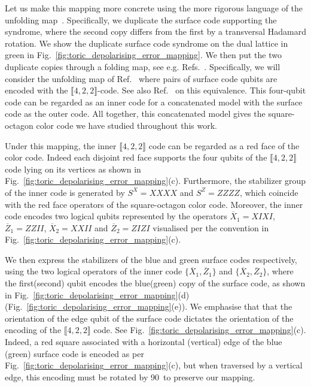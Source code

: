 \documentclass[a4paper,twocolumn,11pt,accepted=2024-12-23]{quantumarticle}
\begin{document}
Let us make this mapping more concrete using the more rigorous language of the unfolding map~\cite{bombin2012universal,Bhagoji15, Kubica_2015}. Specifically, we duplicate the surface code supporting the syndrome, where the second copy differs from the first by a transversal Hadamard rotation. We show the duplicate surface code syndrome on the dual lattice in green in Fig.~\ref{fig:toric_depolarising_error_mapping}.
We then put the two duplicate copies through a folding map, see e.g. Refs.~\cite{bombin2012universal, Kubica_2015, criger2016noise}. Specifically, we will consider the unfolding map of Ref.~\cite{criger2016noise} where pairs of surface code qubits are encoded with the $\llbracket4,2,2 \rrbracket$-code. See also Ref.~\cite{Brell_2011} on this equivalence. This four-qubit code can be regarded as an inner code for a concatenated model with the surface code as the outer code. All together, this concatenated model gives the square-octagon color code we have studied throughout this work.


Under this mapping, the inner $\llbracket4,2,2 \rrbracket$ code can be regarded as a red face of the color code. Indeed each disjoint red face supports the four qubits of the $\llbracket4,2,2 \rrbracket$ code lying on its vertices as shown in Fig.~\ref{fig:toric_depolarising_error_mapping}(c). Furthermore, the stabilizer group of the inner code is generated by $S^X = XXXX$ and $S^Z = ZZZZ$, which coincide with the red face operators of the square-octagon color code. Moreover, the inner code encodes two logical qubits represented by the operators $\overline{X}_1 = XIXI$, $\overline{Z}_1 = ZZII$, $\overline{X}_2 = XXII$ and $\overline{Z}_2 = ZIZI$ visualised per the convention in Fig.~\ref{fig:toric_depolarising_error_mapping}(c). 



We then express the stabilizers of the blue and green surface codes respectively, using the two logical operators of the inner code $\{\overline{X}_1, \overline{Z}_1\}$ and $\{\overline{X}_2, \overline{Z}_2\}$, where the first(second) qubit encodes the blue(green) copy of the surface code, as shown in Fig.~\ref{fig:toric_depolarising_error_mapping}(d) (Fig.~\ref{fig:toric_depolarising_error_mapping}(e)). We emphasise that that the orientation of the edge qubit of the surface code dictates the orientation of the encoding of the $\llbracket4,2,2 \rrbracket$ code. See Fig.~\ref{fig:toric_depolarising_error_mapping}(c). Indeed, a red square associated with a horizontal (vertical) edge of the blue (green) surface code is encoded as per Fig.~\ref{fig:toric_depolarising_error_mapping}(c), but when traversed by a vertical edge, this encoding must be rotated by 90\textdegree~to preserve our mapping. 
\end{document}
